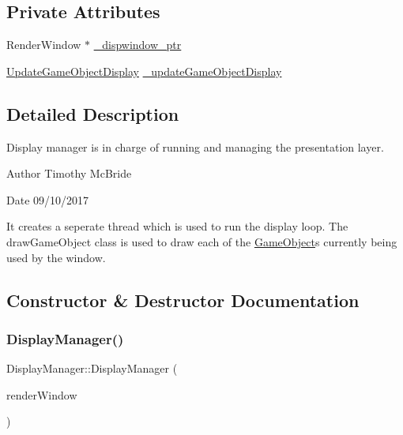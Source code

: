 \subsection*{Private Attributes}
\begin{DoxyCompactItemize}
\item 
Render\+Window $\ast$ \hyperlink{class_display_manager_abe0369d0fa6b544c77d9d50d50f949cf}{\+\_\+dispwindow\+\_\+ptr}
\item 
\hyperlink{class_update_game_object_display}{Update\+Game\+Object\+Display} \hyperlink{class_display_manager_aee260bf088ffc55e21bd1ef282a139db}{\+\_\+update\+Game\+Object\+Display}
\end{DoxyCompactItemize}


\subsection{Detailed Description}
Display manager is in charge of running and managing the presentation layer. 

\begin{DoxyAuthor}{Author}
Timothy Mc\+Bride 
\end{DoxyAuthor}
\begin{DoxyDate}{Date}
09/10/2017
\end{DoxyDate}
It creates a seperate thread which is used to run the display loop. The draw\+Game\+Object class is used to draw each of the \hyperlink{class_game_object}{Game\+Object}\textquotesingle{}s currently being used by the window. 

\subsection{Constructor \& Destructor Documentation}
\mbox{\label{class_display_manager_a5cae0a0f81cbd2457eca8d35733a0516}} 
\subsubsection{\texorpdfstring{Display\+Manager()}{DisplayManager()}}
{\footnotesize\ttfamily Display\+Manager\+::\+Display\+Manager (\begin{DoxyParamCaption}\item[{Render\+Window \&}]{render\+Window }\end{DoxyParamCaption})}



